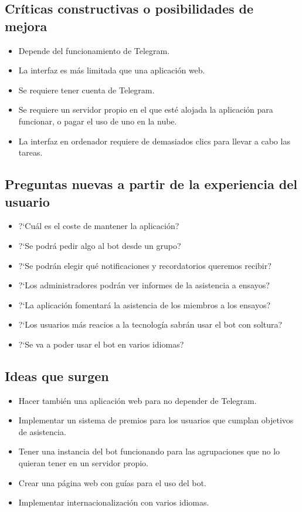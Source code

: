\subsection{Críticas constructivas o posibilidades de mejora}

\begin{itemize}
    \item Depende del funcionamiento de Telegram.
    \item La interfaz es más limitada que una aplicación web.
    \item Se requiere tener cuenta de Telegram.
    \item Se requiere un servidor propio en el que esté alojada la aplicación para funcionar, o pagar el uso de uno en la nube.
    \item La interfaz en ordenador requiere de demasiados clics para llevar a cabo las tareas.
\end{itemize}

\subsection{Preguntas nuevas a partir de la experiencia del usuario}

\begin{itemize}
    \item ?`Cuál es el coste de mantener la aplicación?
    \item ?`Se podrá pedir algo al bot desde un grupo?
    \item ?`Se podrán elegir qué notificaciones y recordatorios queremos recibir?
    \item ?`Los administradores podrán ver informes de la asistencia a ensayos?
    \item ?`La aplicación fomentará la asistencia de los miembros a los ensayos?
    \item ?`Los usuarios más reacios a la tecnología sabrán usar el bot con soltura?
    \item ?`Se va a poder usar el bot en varios idiomas?
\end{itemize}

\subsection{Ideas que surgen}

\begin{itemize}
    \item Hacer también una aplicación web para no depender de Telegram.
    \item Implementar un sistema de premios para los usuarios que cumplan objetivos de asistencia.
    \item Tener una instancia del bot funcionando para las agrupaciones que no lo quieran tener en un servidor propio.
    \item Crear una página web con guías para el uso del bot.
    \item Implementar internacionalización con varios idiomas.
\end{itemize}

